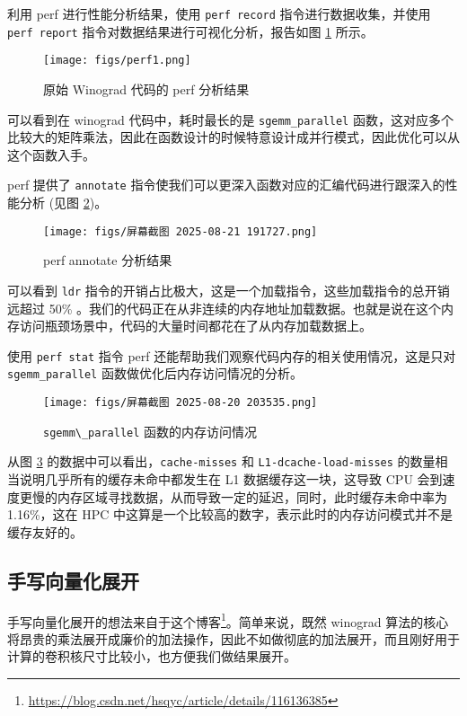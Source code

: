 \documentclass[a4paper,12pt,scheme=plain]{ctexart}
\newcommand{\inlinecode}[1]{\colorbox{gray!10}{\lstinline|#1|}}
\numberwithin{equation}{section} %
\begin{document}
利用 perf 进行性能分析结果，使用 \inlinecode{perf record} 指令进行数据收集，并使用 \inlinecode{perf report} 指令对数据结果进行可视化分析，报告如图 \ref{fig:perf1} 所示。

\begin{figure}[h]
\centering
\texttt{[image: figs/perf1.png]}
\caption{原始 Winograd 代码的 perf 分析结果}
\label{fig:perf1}
\end{figure}

可以看到在 winograd 代码中，耗时最长的是 \inlinecode{sgemm_parallel} 函数，这对应多个比较大的矩阵乘法，因此在函数设计的时候特意设计成并行模式，因此优化可以从这个函数入手。

perf 提供了 \inlinecode{annotate} 指令使我们可以更深入函数对应的汇编代码进行跟深入的性能分析 (见图 \ref{fig:perf_annotate})。

\begin{figure}[h]
\centering
\texttt{[image: figs/屏幕截图 2025-08-21 191727.png]}
\caption{perf annotate 分析结果}
\label{fig:perf_annotate}
\end{figure}

可以看到 \inlinecode{ldr} 指令的开销占比极大，这是一个加载指令，这些加载指令的总开销远超过 50\% 。我们的代码正在从非连续的内存地址加载数据。也就是说在这个内存访问瓶颈场景中，代码的大量时间都花在了从内存加载数据上。

使用 \inlinecode{perf stat} 指令 perf 还能帮助我们观察代码内存的相关使用情况，这是只对 \inlinecode{sgemm_parallel} 函数做优化后内存访问情况的分析。

\begin{figure}[h]
\centering
\texttt{[image: figs/屏幕截图 2025-08-20 203535.png]}
\caption{\inlinecode{sgemm\_parallel} 函数的内存访问情况}
\label{fig:sgemm_memory_access}
\end{figure}

从图 \ref{fig:sgemm_memory_access} 的数据中可以看出，\inlinecode{cache-misses} 和 \inlinecode{L1-dcache-load-misses} 的数量相当说明几乎所有的缓存未命中都发生在 L1 数据缓存这一块，这导致 CPU 会到速度更慢的内存区域寻找数据，从而导致一定的延迟，同时，此时缓存未命中率为 1.16\%，这在 HPC 中这算是一个比较高的数字，表示此时的内存访问模式并不是缓存友好的。

\subsection{手写向量化展开}

手写向量化展开的想法来自于这个博客\footnote{\url{https://blog.csdn.net/hsqyc/article/details/116136385}}。简单来说，既然 winograd 算法的核心将昂贵的乘法展开成廉价的加法操作，因此不如做彻底的加法展开，而且刚好用于计算的卷积核尺寸比较小，也方便我们做结果展开。
\end{document}
